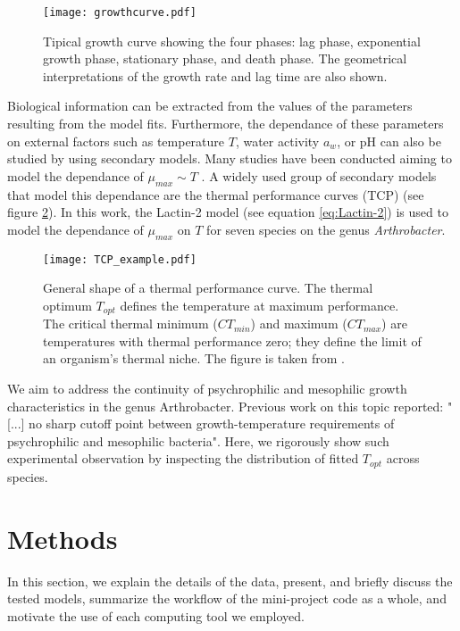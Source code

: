 \documentclass[titlepage,11pt]{article}
\begin{document}
\begin{linenumbers}
			\begin{figure}[h]
				\centering
				\texttt{[image: growthcurve.pdf]}
				\caption{Tipical growth curve showing the four phases: lag phase, exponential growth phase, stationary phase, and death phase. The geometrical interpretations of the growth rate and lag time are also shown.}
				\label{fig:growthcurve}
			\end{figure}
			Biological information can be extracted from the values of the parameters resulting from the model fits. Furthermore, the dependance of these parameters on external factors such as temperature $ T $, water activity $ a_w $, or pH can also be studied by using secondary models. Many studies have been conducted aiming to model the dependance of $ \mu_{max} \sim T $ \cite{Ratkowsky1982, Phillips1987, Stannard1985, DaSilva2018, Zwietering1991, Bernhardt2018, Lactin1995, Valik2013, Logan1976}.  A widely used group of secondary models that model this dependance are the thermal performance curves (TCP) (see figure \ref{fig:TCP_example}). In this work, the Lactin-2 model (see equation \ref{eq:Lactin-2}) is used to model the dependance of $ \mu_{max} $ on $ T $ for seven species on the genus \textit{Arthrobacter}.\\
			\begin{figure}[h]
				\centering
				\texttt{[image: TCP\_example.pdf]}
				\caption{General shape of a thermal performance curve. The thermal optimum $ T_{opt} $ defines the temperature at maximum performance. The critical thermal minimum ($ CT_{min} $) and maximum ($ CT_{max} $) are temperatures with thermal performance zero; they define the limit of an organism's thermal niche. The figure is taken from \cite{Krenek2011}.}
				\label{fig:TCP_example}
			\end{figure}
			We aim to address the continuity of psychrophilic and mesophilic growth characteristics in the genus Arthrobacter. Previous work on this topic \cite{ROTH1962} reported: "[...] no sharp cutoff point between growth-temperature requirements of psychrophilic and mesophilic bacteria". Here, we rigorously show such experimental observation by inspecting the distribution of fitted $ T_{opt} $ across species.\\
			
			\section{Methods}\label{methods}
			
			In this section, we explain the details of the data, present, and briefly discuss the tested models, summarize the workflow of the mini-project code as a whole, and motivate the use of each computing tool we employed.\\
			

\end{linenumbers}
\end{document}
